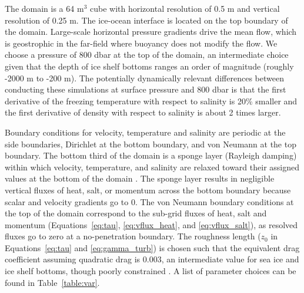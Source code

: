 \documentclass[draft]{agujournal2019}
\begin{document}
The domain is a 64 m$^3$ cube with horizontal resolution of 0.5 m and vertical resolution of 0.25 m. The ice-ocean interface is located on the top boundary of the domain. Large-scale horizontal pressure gradients drive the mean flow, which is geostrophic in the far-field where buoyancy does not modify the flow. We choose a pressure of 800 dbar at the top of the domain, an intermediate choice given that the depth of ice shelf bottoms ranges an order of magnitude (roughly -2000 m to -200 m). The potentially dynamically relevant differences between conducting these simulations at surface pressure and 800 dbar is that the first derivative of the freezing temperature with respect to salinity is 20\% smaller and the first derivative of density with respect to salinity is about 2 times larger.

Boundary conditions for velocity, temperature and salinity are periodic at the side boundaries, Dirichlet at the bottom boundary, and von Neumann at the top boundary. The bottom third of the domain is a sponge layer (Rayleigh damping) within which velocity, temperature, and salinity are relaxed toward their assigned values at the bottom of the domain \cite{klemp_numerical_1978, maronga_parallelized_2015}. The sponge layer results in negligible vertical fluxes of heat, salt, or momentum across the bottom boundary because scalar and velocity gradients go to 0. The von Neumann boundary conditions at the top of the domain correspond to the sub-grid fluxes of heat, salt and momentum (Equations~\ref{eq:tau}, \ref{eq:vflux_heat}, and \ref{eq:vflux_salt}), as resolved fluxes go to zero at a no-penetration boundary. The roughness length ($z_0$ in Equations~\ref{eq:tau} and \ref{eq:gamma_turb}) is chosen such that the equivalent drag coefficient assuming quadratic drag is 0.003, an intermediate value for sea ice and ice shelf bottoms, though poorly constrained \cite{holland_modeling_1999, holland_effects_2006, macayeal_numerical_1984, nicholls_measurements_2006}. A list of parameter choices can be found in Table~\ref{table:var}.
\end{document}
